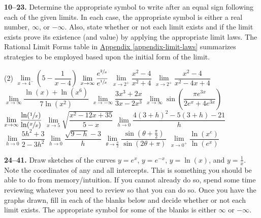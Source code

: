\documentclass[10pt,oneside,]{book}
\theoremstyle{plain}
\theoremstyle{definition}
\numberwithin{equation}{section}
\newcommand{\fe}[2]{#1\mathopen{}\left(#2\right)\mathclose{}}
\begin{document}
\textbf{10--23. }\hypertarget{exercisegroup-32}{\null}Determine the appropriate symbol to write after an equal sign following each of the given limits.  In each case, the appropriate symbol is either a real number, \(\infty\), or \(-\infty\).  Also, state whether or not each limit exists and if the limit exists prove its existence (and value) by applying the appropriate limit laws.  The Rational Limit Forms table in \hyperref[appendix-limit-laws]{Appendix \ref{appendix-limit-laws}} summarizes strategies to be employed based upon the initial form of the limit.%
\par
\begin{exercisegroup}(2)
\exercise[10.]\hypertarget{exercise-146}{\null}\(\lim\limits_{x\to4^{-}}\left(5-\dfrac{1}{x-4}\right)\)%
\exercise[11.]\hypertarget{exercise-147}{\null}\(\lim\limits_{x\to\infty}\dfrac{e^{\sfrac{2}{x}}}{e^{\sfrac{1}{x}}}\)%
\exercise[12.]\hypertarget{exercise-148}{\null}\(\lim\limits_{x\to2^{+}}\dfrac{x^2-4}{x^2+4}\)%
\exercise[13.]\hypertarget{exercise-149}{\null}\(\lim\limits_{x\to2^{+}}\dfrac{x^2-4}{x^2-4x+4}\)%
\exercise[14.]\hypertarget{exercise-150}{\null}\(\lim\limits_{x\to\infty}\dfrac{\fe{\ln}{x}+\fe{\ln}{x^6}}{7\fe{\ln}{x^2}}\)%
\exercise[15.]\hypertarget{exercise-151}{\null}\(\lim\limits_{x\to-\infty}\dfrac{3x^3+2x}{3x-2x^3}\)%
\exercise[16.]\hypertarget{exercise-152}{\null}\(\lim\limits_{x\to\infty}\fe{\sin}{\dfrac{\pi e^{3x}}{2e^x+4e^{3x}}}\)%
\exercise[17.]\hypertarget{exercise-153}{\null}\(\lim\limits_{x\to\infty}\dfrac{\fe{\ln}{\sfrac{1}{x}}}{\fe{\ln}{\sfrac{x}{x}}}\)%
\exercise[18.]\hypertarget{exercise-154}{\null}\(\lim\limits_{x\to5}\sqrt{\dfrac{x^2-12x+35}{5-x}}\)%
\exercise[19.]\hypertarget{exercise-155}{\null}\(\lim\limits_{h\to0}\dfrac{4(3+h)^2-5(3+h)-21}{h}\)%
\exercise[20.]\hypertarget{exercise-156}{\null}\(\lim\limits_{h\to0}\dfrac{5h^2+3}{2-3h^2}\)%
\exercise[21.]\hypertarget{exercise-157}{\null}\(\lim\limits_{h\to0}\dfrac{\sqrt{9-h}-3}{h}\)%
\exercise[22.]\hypertarget{exercise-158}{\null}\(\lim\limits_{\theta\to\frac{\pi}{2}}\dfrac{\fe{\sin}{\theta+\frac{\pi}{2}}}{\fe{\sin}{2\theta+\pi}}\)%
\exercise[23.]\hypertarget{exercise-159}{\null}\(\lim\limits_{x\to0^{+}}\dfrac{\fe{\ln}{x^e}}{\fe{\ln}{e^x}}\)%
\end{exercisegroup}
\par\smallskip\noindent
\textbf{24--41. }\hypertarget{exercisegroup-33}{\null}Draw sketches of the curves \(y=e^x\), \(y=e^{-x}\), \(y=\fe{\ln}{x}\), and \(y=\frac{1}{x}\).  Note the coordinates of any and all intercepts.  This is something you should be able to do from memory/intuition.  If you cannot already do so, spend some time reviewing whatever you need to review so that you can do so. Once you have the graphs drawn, fill in each of the blanks below and decide whether or not each limit exists.  The appropriate symbol for some of the blanks is either \(\infty\) or \(-\infty\).%
\end{document}
